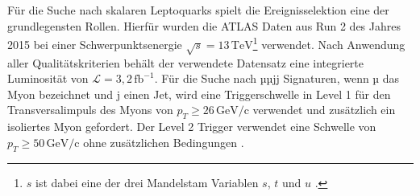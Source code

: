 Für die Suche nach skalaren Leptoquarks spielt die Ereignisselektion eine der grundlegensten Rollen. Hierfür wurden die ATLAS Daten aus Run 2 des Jahres 2015 bei einer Schwerpunktsenergie $\sqrt{s}=13\,\text{TeV}$\footnote{$s$ ist dabei eine der drei Mandelstam Variablen $s$, $t$ und $u$ \cite[S. 94]{Halzen}.} verwendet. Nach Anwendung aller Qualitätskriterien behält der verwendete Datensatz eine integrierte Luminosität von $\mathcal{L}=3{,}2\,\text{fb}^{-1}$. Für die Suche nach µµjj Signaturen, wenn µ das Myon bezeichnet und j einen Jet, wird eine Triggerschwelle in Level 1 für den Transversalimpuls des Myons von $p_T\geq 26\,\text{GeV/c}$ verwendet und zusätzlich ein isoliertes Myon gefordert. Der Level 2 Trigger verwendet eine Schwelle von $p_T\geq 50\,\text{GeV/c}$ ohne zusätzlichen Bedingungen \cite{LQATLAS}.%

